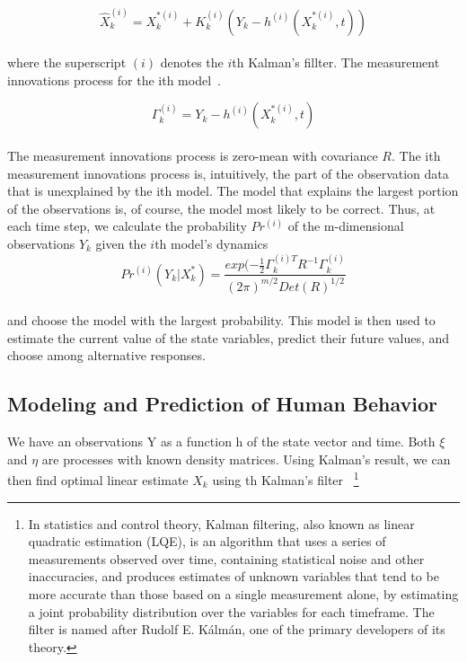 \begin{equation} \label{eq:4}
\hat{X}_{k}^{(i)} = X_{k}^{*(i)} + K_k^{(i)}(Y_k - h^{(i)}(X_{k}^{*(i)},t))
\end{equation}
\\
where the superscript $(i)$ denotes the $i$th Kalman's fillter.
The measurement innovations process for the ith model~\cite{pantland}.

\begin{equation} \label{eq:5}
\Gamma_k^{(i)}= Y_k - h^{(i)}(X_k^{*(i)}, t)
\end{equation}
\\
The measurement innovations process is zero-mean with covariance $R$.
The ith measurement innovations process is, intuitively, the part of the observation data that is unexplained by the ith model.
The model that explains the largest portion of the observations is, of course, the model most likely to be correct.
Thus, at each time step, we calculate the probability $Pr^{(i)}$ of the m-dimensional observations $Y_k$ given the $i$th model's dynamics~\cite{pantland}
\\
\begin{equation} \label{eq:6}
Pr^{(i)}(Y_k|X_k^*) = \frac{exp(-\frac{1}{2}\Gamma_k^{(i)T}R^{-1}\Gamma_k^{(i)}}{(2\pi)^{m/2} Det(R)^{1/2}}
\end{equation}
\\
and choose the model with the largest probability.
This model is then used to estimate the current value of the state variables, predict their future values, and choose among alternative responses.

\subsection{Modeling and Prediction of Human Behavior} \label{subsec:prediction}

We have an observations Y as a function h of the state vector and time.
Both $\xi$ and $\eta$ are processes with known density matrices.
Using Kalman's result, we can then find optimal linear estimate $X_k$ using th Kalman's filter~\cite{pantland} \footnote{In statistics
and control theory, Kalman filtering, also known as linear quadratic estimation (LQE), is an algorithm that
uses a series of measurements observed over time, containing statistical noise and other inaccuracies, and produces
estimates of unknown variables that tend to be more accurate than those based on a single measurement alone, by estimating
a joint probability distribution over the variables for each timeframe.
The filter is named after Rudolf E. Kálmán, one of the primary developers of its theory.}

